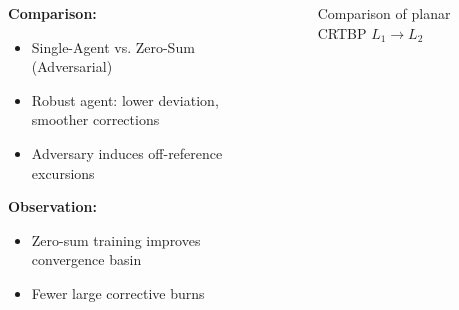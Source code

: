 \begin{frame}
\begin{columns}[T]
\begin{column}{0.52\textwidth}
      \textbf{Comparison:}
      \begin{itemize}\setlength{\itemsep}{3pt}
        \item Single-Agent vs. Zero-Sum (Adversarial)
        \item Robust agent: lower deviation, smoother corrections
        \item Adversary induces off-reference excursions
      \end{itemize}
      \vspace{2pt}
      \textbf{Observation:}
      \begin{itemize}\setlength{\itemsep}{3pt}
        \item Zero-sum training improves convergence basin
        \item Fewer large corrective burns
      \end{itemize}
    \end{column}
    \begin{column}{0.48\textwidth}
      \vspace{0.2cm}
      \begin{figure}
        \hspace{-.8cm}
        \hspace{0pt}%
        \caption{Comparison of planar CRTBP $L_1 \rightarrow L_2$}
      \end{figure}
        \end{column}
      \end{columns}
    \end{frame}


